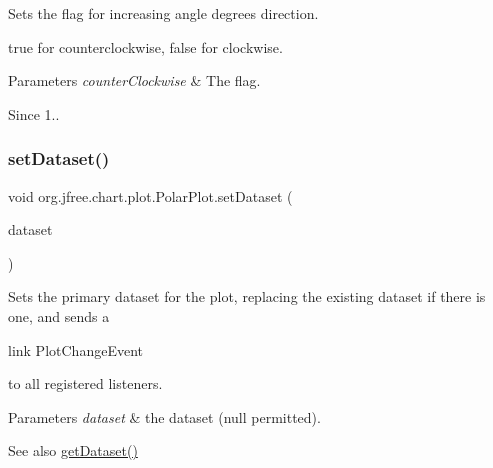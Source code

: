 Sets the flag for increasing angle degrees direction.

{\ttfamily true} for counterclockwise, {\ttfamily false} for clockwise.


\begin{DoxyParams}{Parameters}
{\em counter\+Clockwise} & The flag. \\
\hline
\end{DoxyParams}
\begin{DoxySince}{Since}
1.. 
\end{DoxySince}
\mbox{\label{classorg_1_1jfree_1_1chart_1_1plot_1_1_polar_plot_a6efa675b137d949333947bb975095865}} 
\subsubsection{\texorpdfstring{set\+Dataset()}{setDataset()}\hspace{0.1cm}{\footnotesize\ttfamily [1/2]}}
{\footnotesize\ttfamily void org.\+jfree.\+chart.\+plot.\+Polar\+Plot.\+set\+Dataset (\begin{DoxyParamCaption}\item[{\mbox{\hyperlink{interfaceorg_1_1jfree_1_1data_1_1xy_1_1_x_y_dataset}{X\+Y\+Dataset}}}]{dataset }\end{DoxyParamCaption})}

Sets the primary dataset for the plot, replacing the existing dataset if there is one, and sends a
\begin{DoxyCode}
link PlotChangeEvent 
\end{DoxyCode}
 to all registered listeners.


\begin{DoxyParams}{Parameters}
{\em dataset} & the dataset ({\ttfamily null} permitted).\\
\hline
\end{DoxyParams}
\begin{DoxySeeAlso}{See also}
\mbox{\hyperlink{classorg_1_1jfree_1_1chart_1_1plot_1_1_polar_plot_a892ef9a10b53bb72c6f6ccc003236f9a}{get\+Dataset()}} 
\end{DoxySeeAlso}
\mbox{\label{classorg_1_1jfree_1_1chart_1_1plot_1_1_polar_plot_a281f527dd6ecc96f700fd97304c1b9d5}} 
